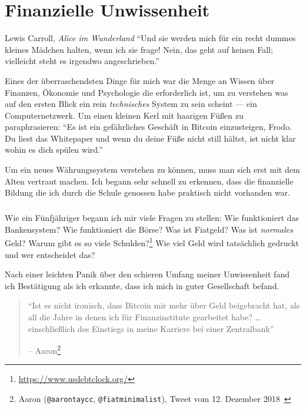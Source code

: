 \chapter{Finanzielle Unwissenheit}
\label{les:8}

\begin{chapquote}{Lewis Carroll, \textit{Alice im Wunderland}}
\enquote{Und sie werden mich für ein recht dummes kleines Mädchen halten, wenn ich sie frage! Nein, das geht auf keinen Fall; vielleicht steht es irgendwo angeschrieben.}
\end{chapquote}

Eines der überraschendsten Dinge für mich war die Menge an Wissen über Finanzen,
Ökonomie und Psychologie die erforderlich ist, um zu verstehen was auf den
ersten Blick ein rein \textit{technisches} System zu sein scheint --- ein
Computernetzwerk. Um einen kleinen Kerl mit haarigen Füßen zu paraphrasieren:
\enquote{Es ist ein gefährliches Geschäft in Bitcoin einzusteigen, Frodo. Du
liest das Whitepaper und wenn du deine Füße nicht still hältst, ist nicht klar
wohin es dich spülen wird.}

Um ein neues Währungssystem verstehen zu können, muss man sich erst mit dem
Alten vertraut machen. Ich begann sehr schnell zu erkennen, dass die finanzielle
Bildung die ich durch die Schule genossen habe praktisch nicht vorhanden war.

\paragraph{}
Wie ein Fünfjähriger begann ich mir viele Fragen zu stellen: Wie funktioniert
das Bankensystem? Wie funktioniert die Börse? Was ist Fiatgeld? Was ist
\textit{normales} Geld? Warum gibt es so viele
Schulden?\footnote{\url{https://www.usdebtclock.org/}} Wie viel Geld wird
tatsächlich gedruckt und wer entscheidet das?

\newpage

Nach einer leichten Panik über den schieren Umfang meiner Unwissenheit fand ich
Bestätigung als ich erkannte, dass ich mich in guter Gesellschaft befand.

\begin{quotation}\begin{samepage}
\enquote{Ist es nicht ironisch, dass Bitcoin mir mehr über Geld beigebracht hat,
als all die Jahre in denen ich für Finanzinstitute gearbeitet habe? \ldots
einschließlich des Einstiegs in meine Karriere bei einer Zentralbank}
\begin{flushright} -- Aaron\footnote{Aaron (\texttt{@aarontaycc}, \texttt{@fiatminimalist}), Tweet vom 12. Dezember 2018~\cite{aarontaycc-tweet}}
\end{flushright}\end{samepage}\end{quotation}

